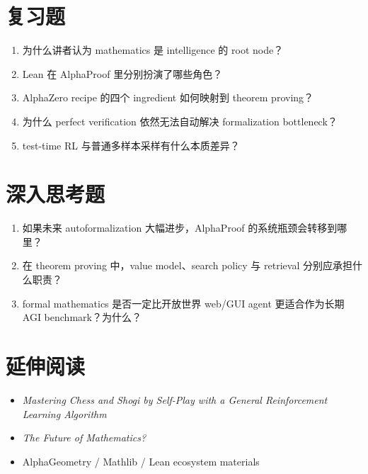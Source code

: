 \documentclass[a4paper]{article}
\begin{document}
\section{复习题}

\begin{enumerate}
\item 为什么讲者认为 mathematics 是 intelligence 的 root node？
\item Lean 在 AlphaProof 里分别扮演了哪些角色？
\item AlphaZero recipe 的四个 ingredient 如何映射到 theorem proving？
\item 为什么 perfect verification 依然无法自动解决 formalization bottleneck？
\item test-time RL 与普通多样本采样有什么本质差异？
\end{enumerate}

\section{深入思考题}

\begin{enumerate}
\item 如果未来 autoformalization 大幅进步，AlphaProof 的系统瓶颈会转移到哪里？
\item 在 theorem proving 中，value model、search policy 与 retrieval 分别应承担什么职责？
\item formal mathematics 是否一定比开放世界 web/GUI agent 更适合作为长期 AGI benchmark？为什么？
\end{enumerate}

\section{延伸阅读}

\begin{itemize}
\item \emph{Mastering Chess and Shogi by Self-Play with a General Reinforcement Learning Algorithm}
\item \emph{The Future of Mathematics?}
\item AlphaGeometry / Mathlib / Lean ecosystem materials
\end{itemize}
\end{document}
